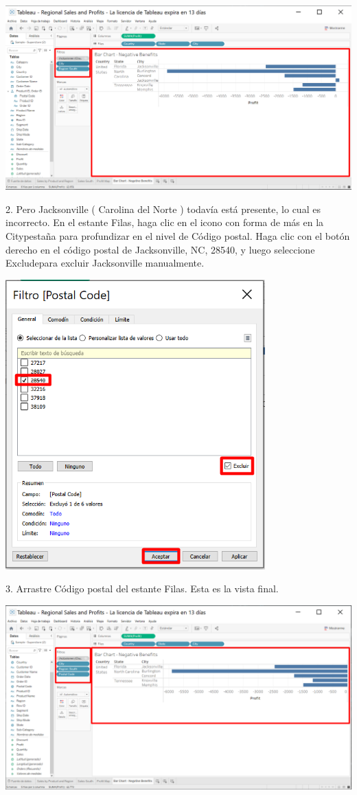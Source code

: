 \documentclass[12pt,letterpaper]{article}
\begin{document}
\begin{center}
    \includegraphics[width=16cm]{img/35.png}  
\end{center}
2. Pero Jacksonville ( Carolina del Norte ) todavía está presente, lo cual es incorrecto. En el
estante Filas, haga clic en el icono con forma de más en la Citypestaña para profundizar en el
nivel de Código postal. Haga clic con el botón derecho en el código postal de Jacksonville, NC,
28540, y luego seleccione Excludepara excluir Jacksonville manualmente.
\begin{center}
    \includegraphics[width=10cm]{img/36.png}  
\end{center}
3. Arrastre Código postal del estante Filas. Esta es la vista final.
\begin{center}
    \includegraphics[width=16cm]{img/37.png}  
\end{center}
\end{document}
